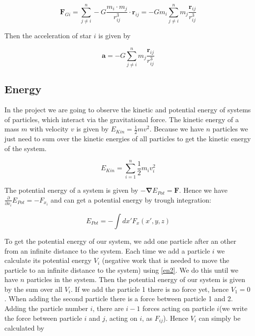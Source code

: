\documentclass[10pt,a4paper]{article}
\begin{document}
\begin{equation}	
\label{eq:gra2}
\mathbf{F}_{Gi} = \sum_{j \neq i}^{n} - G \frac{m_i \cdot m_j}{r_{ij}^3} \cdot \mathbf{r}_{ij} = - G m_i \sum_{j \neq i}^{n} m_j \frac{\mathbf{r}_{ij}}{r_{ij}^3}
\end{equation}

Then the acceleration of star $i$ is given by

\begin{equation}	
\label{eq:gra3}
\mathbf{a} = - G \sum_{j \neq i}^{n} m_j \frac{\mathbf{r}_{ij}}{r_{ij}^3}
\end{equation}

\subsection{Energy}

In the project we are going to observe the kinetic and potential energy of systems of particles, which interact via the gravitational force. The kinetic energy of a mass $m$ with velocity $v$ is given by $E_{Kin} = \frac{1}{2} m v^2$. Because we have $n$ particles we just need to sum over the kinetic energies of all particles to get the kinetic energy of the system.

\begin{equation}	
\label{en1}
E_{Kin} = \sum_{i = 1}^{n} \frac{1}{2} m_i v_i^2
\end{equation}

The potential energy of a system is given by $- \mathbf{\nabla} E_{Pot} = \mathbf{F}$. Hence we have $\frac{\partial}{\partial x_i}E_{Pot} =- F_{x_i}$ and can get a potential energy by trough integration:

\begin{equation}
\label{en2}
	E_{Pot} = - \int dx' F_{x}(x', y ,z)
\end{equation}

To get the potential energy of our system, we add one particle after an other from an infinite distance to the system. Each time we add a particle $i$ we calculate its potential energy $V_i$ (negative work that is needed to move the particle to an infinite distance to the system) using \eqref{en2}. We do this until we have $n$ particles in the system. Then the potential energy of our system is given by the sum over all $V_i$. If we add the particle 1 there is no force yet, hence $V_1 = 0$. When adding the second particle there is a force between particle 1 and 2. Adding the particle number $i$, there are $i-1$ forces acting on particle $i$(we write the force between particle $i$ and $j$, acting on $i$, as $F_{ij}$). Hence $V_i$ can simply be calculated by
\end{document}
